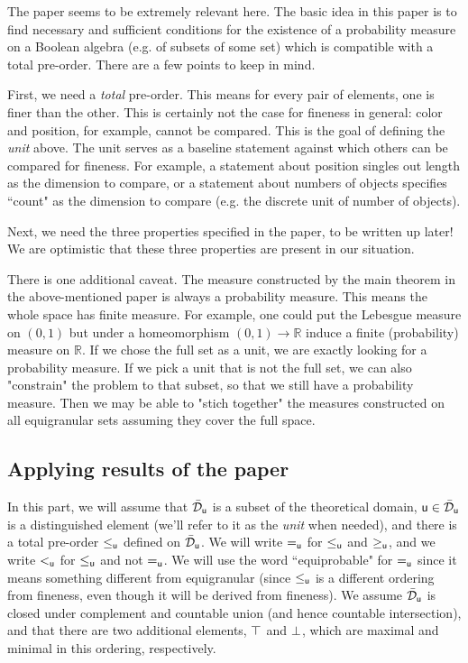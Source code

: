\documentclass[10pt, onecolumn, longbibliography, nofootinbib]{revtex4-2}
\begin{document}
The paper \cite{probexistence} seems to be extremely relevant here. The basic idea in this paper is to find necessary and sufficient conditions for the existence of a probability measure on a Boolean algebra (e.g. of subsets of some set) which is compatible with a total pre-order. There are a few points to keep in mind. 

First, we need a \emph{total} pre-order. This means for every pair of elements, one is finer than the other. This is certainly not the case for fineness in general: color and position, for example, cannot be compared. This is the goal of defining the \emph{unit} above. The unit serves as a baseline statement against which others can be compared for fineness. For example, a statement about position singles out length as the dimension to compare, or a statement about numbers of objects specifies ``count" as the dimension to compare (e.g. the discrete unit of number of objects). 

Next, we need the three properties specified in the paper, to be written up later! We are optimistic that these three properties are present in our situation. 

There is one additional caveat. The measure constructed by the main theorem in the above-mentioned paper is always a probability measure. This means the whole space has finite measure. For example, one could put the Lebesgue measure on $(0,1)$ but under a homeomorphism $(0,1)\to\mathbb{R}$ induce a finite (probability) measure on  $\mathbb{R}$. If we chose the full set as a unit, we are exactly looking for a probability measure. If we pick a unit that is not the full set, we can also "constrain" the problem to that subset, so that we still have a probability measure. Then we may be able to "stich together" the measures constructed on all equigranular sets assuming they cover the full space. 

\subsection{Applying results of the paper \cite{villegas}}

In this part, we will assume that $\tdomain_{\stmt[u]}$ is a subset of the theoretical domain, $\stmt[u]\in \tdomain_{\stmt[u]}$ is a distinguished element (we'll refer to it as the \emph{unit} when needed), and there is a total pre-order $\leq_{\stmt[u]}$ defined on $\tdomain_{\stmt[u]}$. We will write $=_{\stmt[u]}$ for $\leq_{\stmt[u]}$ and $\geq_{\stmt[u]}$, and we write $<_{\stmt[u]}$ for $\leq_{\stmt[u]}$ and not $=_{\stmt[u]}$. We will use the word ``equiprobable" for $=_{\stmt[u]}$ since it means something different from equigranular (since $\leq_{\stmt[u]}$ is a different ordering from fineness, even though it will be derived from fineness). We assume $\tdomain_{\stmt[u]}$ is closed under complement and countable union (and hence countable intersection), and that there are two additional elements, $\certainty$ and $\impossibility$, which are maximal and minimal in this ordering, respectively.
\end{document}
